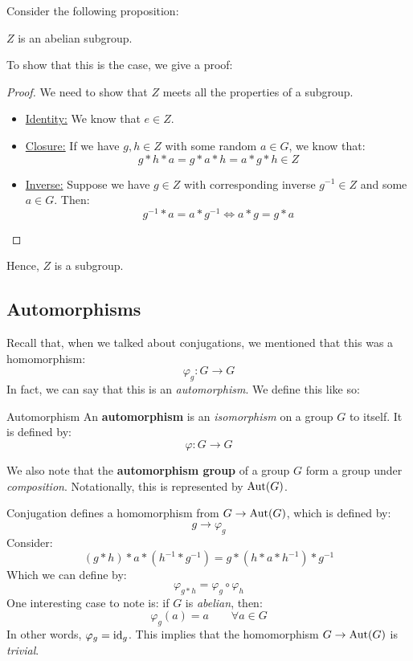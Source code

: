 \documentclass[letterpaper]{article}
\begin{document}
Consider the following proposition: 
\begin{mdframed}
    \begin{proposition}
        $Z$ is an abelian subgroup. 
    \end{proposition}
\end{mdframed}
To show that this is the case, we give a proof: 
\begin{mdframed}
    \begin{proof}
        We need to show that $Z$ meets all the properties of a subgroup. 
        \begin{itemize}
            \item \underline{Identity:} We know that $e \in Z$. 
            \item \underline{Closure:} If we have $g, h \in Z$ with some random $a \in G$, we know that: 
            \[g * h * a = g * a * h = a * g * h \in Z\]
            \item \underline{Inverse:} Suppose we have $g \in Z$ with corresponding inverse $g^{-1} \in Z$ and some $a \in G$. Then: 
            \[g^{-1} * a = a * g^{-1} \iff a * g = g * a\]
        \end{itemize}
    \end{proof}
    Hence, $Z$ is a subgroup. 
\end{mdframed}

\subsection{Automorphisms}
Recall that, when we talked about conjugations, we mentioned that this was a homomorphism: 
\[\varphi_g: G \to G\]
In fact, we can say that this is an \emph{automorphism}. We define this like so: 
\begin{definition}{Automorphism}{}
    An \textbf{automorphism} is an \emph{isomorphism} on a group $G$ to itself. It is defined by: 
    \[\varphi: G \to G\]
\end{definition}
We also note that the \textbf{automorphism group} of a group $G$ form a group under \emph{composition}. Notationally, this is represented by $\operatorname{Aut}(G)$.

\bigskip 

Conjugation defines a homomorphism from $G \to \operatorname{Aut}(G)$, which is defined by: 
\[g \to \varphi_g\]
Consider:
\[(g * h) * a * (h^{-1} * g^{-1}) = g * (h * a * h^{-1}) * g^{-1}\]
Which we can define by: 
\[\varphi_{g * h} = \varphi_g \circ \varphi_h\]
One interesting case to note is: if $G$ is \emph{abelian}, then: 
\[\varphi_g (a) = a \qquad \forall a \in G\]
In other words, $\varphi_g = \operatorname{id}_g$. This implies that the homomorphism $G \to \operatorname{Aut}(G)$ is \emph{trivial}.
\end{document}
